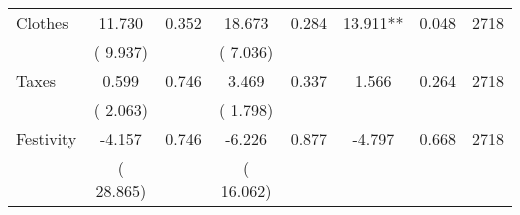 \begin{tabular}{l*{7}{c}}
 Clothes       &             11.730       &        0.352  &             18.673       &        0.284  &             13.911**       &              0.048 &  2718 \\ 
                       &       (       9.937)             &                               &       (       7.036)                     &                               &                                               &                                &                      \\ 

 Taxes       &              0.599       &        0.746  &              3.469       &        0.337  &              1.566       &              0.264 &  2718 \\ 
                       &       (       2.063)             &                               &       (       1.798)                     &                               &                                               &                                &                      \\ 

 Festivity       &             -4.157       &        0.746  &             -6.226       &        0.877  &             -4.797       &              0.668 &  2718 \\ 
                       &       (      28.865)             &                               &       (      16.062)                     &                               &                                               &                                &                      \\ 

\hline \end{tabular}
